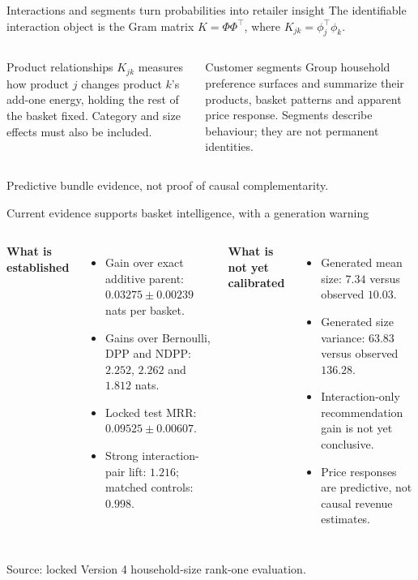 \documentclass[aspectratio=169,11pt,t]{beamer}
\newcommand{\blue}[1]{\textcolor{Accent}{#1}}
\newcommand{\smallsource}[1]{\vfill{\tiny\color{Muted}#1}}
\begin{document}
\begin{frame}{Interactions and segments turn probabilities into retailer insight}
\small
The identifiable interaction object is the Gram matrix
$K=\Phi\Phi^{\top}$, where $K_{jk}=\phi_j^{\top}\phi_k$.

\begin{columns}[T,onlytextwidth]
  \begin{block}{Product relationships}
  $K_{jk}$ measures how product $j$ changes product $k$'s add-one energy, holding the rest
  of the basket fixed. Category and size effects must also be included.
  \end{block}

  \begin{block}{Customer segments}
  Group household preference surfaces and summarize their products, basket patterns and
  apparent price response. Segments describe behaviour; they are not permanent identities.
  \end{block}
\end{columns}

\vspace{0.05cm}
\blue{Predictive bundle evidence, not proof of causal complementarity.}
\end{frame}

\begin{frame}{Current evidence supports basket intelligence, with a generation warning}
\small
\begin{columns}[T,onlytextwidth]
  \textbf{What is established}
  \begin{itemize}
    \item Gain over exact additive parent:
          $0.03275\pm0.00239$ nats per basket.
    \item Gains over Bernoulli, DPP and NDPP:
          $2.252$, $2.262$ and $1.812$ nats.
    \item Locked test MRR: $0.09525\pm0.00607$.
    \item Strong interaction-pair lift: $1.216$;
          matched controls: $0.998$.
  \end{itemize}

  \textbf{What is not yet calibrated}
  \begin{itemize}
    \item Generated mean size: $7.34$ versus observed $10.03$.
    \item Generated size variance: $63.83$ versus observed $136.28$.
    \item Interaction-only recommendation gain is not yet conclusive.
    \item Price responses are predictive, not causal revenue estimates.
  \end{itemize}
\end{columns}

\smallsource{Source: locked Version 4 household-size rank-one evaluation.}
\end{frame}
\end{document}
